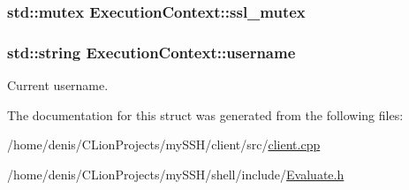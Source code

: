 \subsubsection[{\texorpdfstring{ssl\+\_\+mutex}{ssl_mutex}}]{\setlength{\rightskip}{0pt plus 5cm}std\+::mutex Execution\+Context\+::ssl\+\_\+mutex}\hypertarget{structExecutionContext_a241cad372197f9880a9af9e93ecd7633}{}\label{structExecutionContext_a241cad372197f9880a9af9e93ecd7633}
\subsubsection[{\texorpdfstring{username}{username}}]{\setlength{\rightskip}{0pt plus 5cm}std\+::string Execution\+Context\+::username}\hypertarget{structExecutionContext_a6c1bbd4dcfc82e4902c4382af69ab6d9}{}\label{structExecutionContext_a6c1bbd4dcfc82e4902c4382af69ab6d9}


Current username. 



The documentation for this struct was generated from the following files\+:\begin{DoxyCompactItemize}
\item 
/home/denis/\+C\+Lion\+Projects/my\+S\+S\+H/client/src/\hyperlink{client_8cpp}{client.\+cpp}\item 
/home/denis/\+C\+Lion\+Projects/my\+S\+S\+H/shell/include/\hyperlink{Evaluate_8h}{Evaluate.\+h}\end{DoxyCompactItemize}
